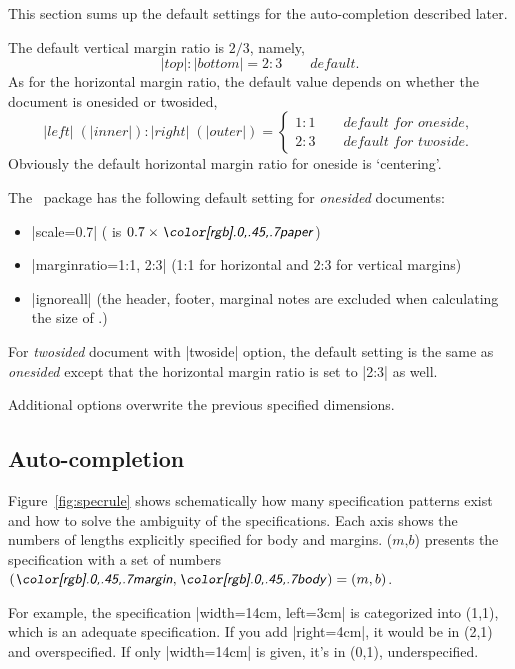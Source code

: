  This section sums up the default settings for the auto-completion
 described later.
 
 The default vertical margin ratio is $2/3$, namely,
 \begin{equation}
  |top| : |bottom| = 2 : 3 \qquad\textit{default}.
 \end{equation}
 As for the horizontal margin ratio, the default value depends on
 whether the document is onesided or twosided,
 \begin{equation}
  |left|\;(|inner|) : |right|\;(|outer|) 
       = \left\{ \begin{array}{ll}
              1 : 1 \qquad\textit{default for oneside},\\
              2 : 3 \qquad\textit{default for twoside}.
         \end{array}\right.
 \end{equation}
 Obviously the default horizontal margin ratio for oneside is `centering'.

 The \Gm\ package has the following default setting for
 \textit{onesided} documents:
 \begin{itemize}\setlength{\itemsep}{-.5\parsep}
  \item |scale=0.7| ( is $0.7 \times \gpart{paper}$)
  \item |marginratio={1:1, 2:3}| (1:1 for horizontal and 2:3 for vertical margins)
  \item |ignoreall| (the header, footer, marginal notes are excluded
  when calculating the size of .)
\end{itemize}
 For \textit{twosided} document with |twoside| option, the default
 setting is the same as \textit{onesided} except that the horizontal
 margin ratio is set to |2:3| as well.

 Additional options overwrite the previous specified dimensions. 

 \subsection{Auto-completion} \label{sec:rules}

 Figure~\ref{fig:specrule} shows schematically how many specification
 patterns exist and how to solve the ambiguity of the
 specifications. Each axis shows the numbers of lengths
 explicitly specified for body and margins. \Ss($m$,$b$) presents the
 specification with a set of numbers $(\gpart{margin},\gpart{body})=(m,b)$.

 For example, the specification |width=14cm, left=3cm| is categorized
 into \Ss(1,1), which is an adequate specification. If you add
 |right=4cm|, it would be in \Ss(2,1) and overspecified. 
 If only |width=14cm| is given, it's in \Ss(0,1), underspecified. 

